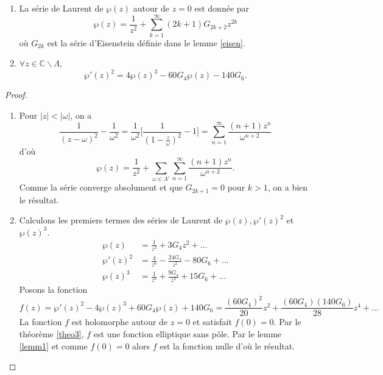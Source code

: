 \documentclass[a4paper]{article}
\begin{document}
\begin{theorem}  \label{theo4}
\begin{enumerate}
\item La série de Laurent de $\wp(z)$ autour de $z=0$ est donnée par 
\begin{equation*}
\wp(z)=\frac{1}{z^2}+ \sum \limits_{k=1}^{\infty} (2k+1)G_{2k+2}z^{2k}
\end{equation*}
où $G_{2k}$ est la série d'Eisenstein définie dans le lemme \ref{eisen}.
\item $\forall z \in \mathbb{C} \backslash \Lambda$, 
\begin{equation*}
\wp'(z)^2=4\wp(z)^3-60G_{4}\wp(z)-140G_{6}.
\end{equation*}
\end{enumerate}
\end{theorem}

\begin{proof}
\begin{enumerate}
\item Pour $|z| < |\omega|$, on a
\begin{equation*}
 \frac{1}{(z-\omega)^2}-\frac{1}{\omega^2}=\frac{1}{\omega^2} \Bigg[ \frac{1}{(1-\frac{z}{\omega})^2}-1 \Bigg]= \sum \limits_{n=1}^{\infty} \frac{(n+1)z^n}{\omega^{n+2}}
\end{equation*}
d'où
\begin{equation*}
\wp(z)=\frac{1}{z^2}+\sum \limits_{\omega \in \Lambda'}
\sum \limits_{n=1}^{\infty} \frac{(n+1)z^n}{\omega^{n+2}}.
\end{equation*}
Comme la série converge absolument et que $G_{2k+1}=0$ pour $k>1$, on a bien le résultat.
\item Calculons les premiers termes des séries de Laurent de $\wp(z),\wp'(z)^2$ et $\wp(z)^3$.
\begin{align*}
\wp(z) &= \frac{1}{z^2}+3G_{4}z^2+... \\
\wp'(z)^2 &= \frac{4}{z^6}-\frac{24G_{4}}{z^2}-80G_{6}+... \\
\wp(z)^3 &=\frac{1}{z^6}+\frac{9G_{4}}{z^2}+15G_{6}+...
\end{align*}
Posons la fonction
\begin{equation*}
f(z)=\wp'(z)^2-4\wp(z)^3+60G_{4}\wp(z)+140G_{6}=\frac{(60G_{4})^2}{20}z^2+\frac{(60G_{4})(140G_{6})}{28}z^4+...
\end{equation*}
La fonction $f$ est holomorphe autour de $z=0$ et satisfait $f(0)=0$. Par le théorème \ref{theo3}, $f$ est une fonction elliptique sans pôle. Par le lemme \ref{lemm1} et comme $f(0)=0$ alors $f$ est la fonction nulle d'où le résultat.
\end{enumerate}
\end{proof}
\end{document}
